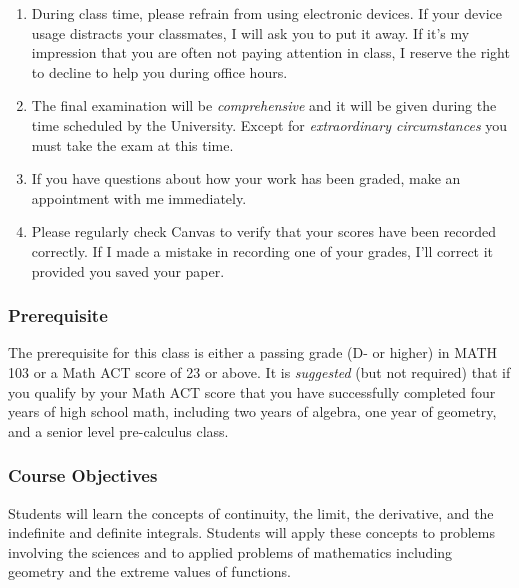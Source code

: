 \documentclass[12pt]{article}
\newcounter{ex}\setcounter{ex}{0}
\begin{document}
\begin{enumerate}
\item During class time, please refrain from using electronic devices. If your 
device usage distracts your classmates, I will ask you to put it away. If it's my 
impression that you are often not paying attention in class, I reserve the right to 
decline to help you during office hours.

\item The final examination will be \emph{comprehensive} and it will be given 
during the  time scheduled by the University. Except for \emph{extraordinary circumstances}
you must take the exam at this time.
 
\item If you have questions about how your work has been graded, make an appointment with me immediately.



\item Please regularly check Canvas  to verify that your scores have 
been recorded correctly.  If I made a mistake in recording one of
your grades, I'll correct it provided you saved your paper.



\end{enumerate}







\subsubsection*{Prerequisite}

The prerequisite for this class is either a passing grade (D- or higher) in MATH 103 or a Math ACT score of 23 or above.  It is \emph{suggested} (but not required)  that if you qualify by your Math ACT score that you have successfully completed  four years of high school math, including two  years of  algebra, one year of geometry,  and a senior  level pre-calculus class.



\subsubsection*{Course Objectives}

Students will learn the concepts of continuity,  the limit, the derivative, and the indefinite and definite integrals. Students will apply these concepts to problems involving the sciences and to applied problems of mathematics including geometry and the extreme values of functions.
\end{document}
